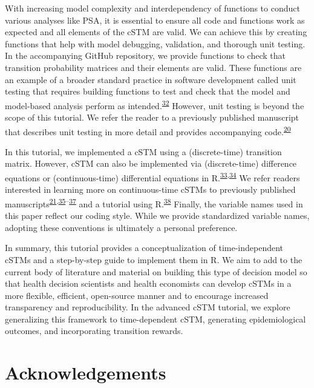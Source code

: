 \documentclass[
]{article}
\begin{document}
With increasing model complexity and interdependency of functions to conduct various analyses like PSA, it is essential to ensure all code and functions work as expected and all elements of the cSTM are valid. We can achieve this by creating functions that help with model debugging, validation, and thorough unit testing. In the accompanying GitHub repository, we provide functions to check that transition probability matrices and their elements are valid. These functions are an example of a broader standard practice in software development called unit testing that requires building functions to test and check that the model and model-based analysis perform as intended.\textsuperscript{\protect\hyperlink{ref-Wickham2021}{32}} However, unit testing is beyond the scope of this tutorial. We refer the reader to a previously published manuscript that describes unit testing in more detail and provides accompanying code.\textsuperscript{\protect\hyperlink{ref-Alarid-Escudero2019e}{20}}

In this tutorial, we implemented a cSTM using a (discrete-time) transition matrix. However, cSTM can also be implemented via (discrete-time) difference equations or (continuous-time) differential equations in R.\textsuperscript{\protect\hyperlink{ref-Grimmett2014}{33},\protect\hyperlink{ref-Axler2005}{34}} We refer readers interested in learning more on continuous-time cSTMs to previously published manuscripts\textsuperscript{\protect\hyperlink{ref-VanRosmalen2013}{21},\protect\hyperlink{ref-Cao2016}{35}--\protect\hyperlink{ref-Soares2012}{37}} and a tutorial using R.\textsuperscript{\protect\hyperlink{ref-Frederix2013a}{38}} Finally, the variable names used in this paper reflect our coding style. While we provide standardized variable names, adopting these conventions is ultimately a personal preference.

In summary, this tutorial provides a conceptualization of time-independent cSTMs and a step-by-step guide to implement them in R. We aim to add to the current body of literature and material on building this type of decision model so that health decision scientists and health economists can develop cSTMs in a more flexible, efficient, open-source manner and to encourage increased transparency and reproducibility. In the advanced cSTM tutorial, we explore generalizing this framework to time-dependent cSTM, generating epidemiological outcomes, and incorporating transition rewards.

\hypertarget{acknowledgements}{%
\section{Acknowledgements}\label{acknowledgements}}
\end{document}

